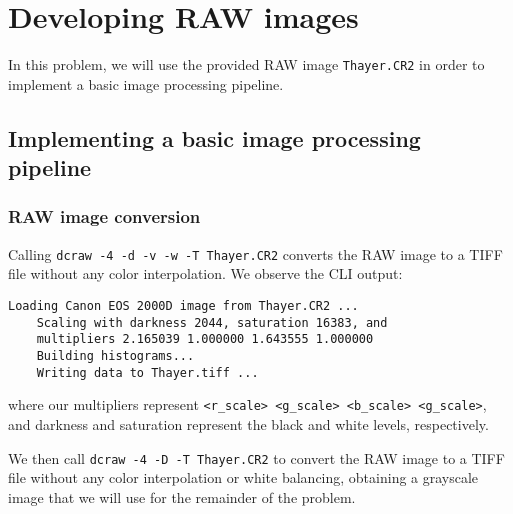 \section{Developing RAW images}
In this problem, we will use the provided RAW image \texttt{Thayer.CR2} 
in order to implement a basic image processing pipeline.

\subsection{Implementing a basic image processing pipeline}

\subsubsection*{RAW image conversion}

Calling \texttt{dcraw -4 -d -v -w -T Thayer.CR2} 
converts the RAW image to a TIFF file without any color interpolation. 
We observe the CLI output:
\begin{Verbatim}[fontsize=\small]
    Loading Canon EOS 2000D image from Thayer.CR2 ...
    Scaling with darkness 2044, saturation 16383, and
    multipliers 2.165039 1.000000 1.643555 1.000000
    Building histograms...
    Writing data to Thayer.tiff ...
\end{Verbatim}
where our multipliers represent \texttt{<r\_scale> <g\_scale> <b\_scale> <g\_scale>},
and darkness and saturation represent the black and white levels, respectively.

\noindent We then call \texttt{dcraw -4 -D -T Thayer.CR2} to convert the RAW image to a TIFF file 
without any color interpolation or white balancing, obtaining a grayscale image that  
we will use for the remainder of the problem.